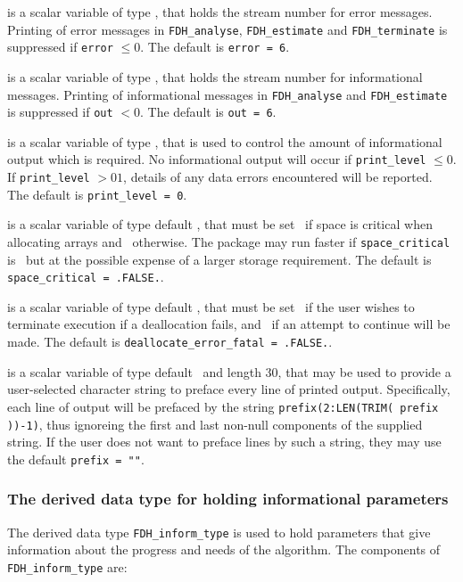 \documentclass{galahad}
\newcommand{\packagename}{FDH}
\begin{document}
\begin{description}

 is a scalar variable of type \integer, that holds the
stream number for error messages. Printing of error messages in 
{\tt \packagename\_analyse},
{\tt \packagename\_estimate} 
and {\tt \packagename\_terminate} 
is suppressed if {\tt error} $\leq 0$.
The default is {\tt error = 6}.

 is a scalar variable of type \integer, that holds the
stream number for informational messages. Printing of informational messages in 
{\tt \packagename\_analyse} and {\tt \packagename\_estimate} 
is suppressed if {\tt out} $< 0$.
The default is {\tt out = 6}.

 is a scalar variable of type \integer, that is used
to control the amount of informational output which is required. No 
informational output will occur if {\tt print\_level} $\leq 0$. If 
{\tt print\_level} $> 01$, details of any data errors encountered 
will be reported.
The default is {\tt print\_level = 0}.

 is a scalar variable of type default \logical, 
that must be set \true\ if space is critical when allocating arrays
and  \false\ otherwise. The package may run faster if 
{\tt space\_critical} is \false\ but at the possible expense of a larger
storage requirement. The default is {\tt space\_critical = .FALSE.}.

 is a scalar variable of type default \logical, 
that must be set \true\ if the user wishes to terminate execution if
a deallocation  fails, and \false\ if an attempt to continue
will be made. The default is {\tt deallocate\_error\_fatal = .FALSE.}.

 is a scalar variable of type default \character\
and length 30, that may be used to provide a user-selected 
character string to preface every line of printed output. 
Specifically, each line of output will be prefaced by the string 
{\tt prefix(2:LEN(TRIM( prefix ))-1)},
thus ignoreing the first and last non-null components of the
supplied string. If the user does not want to preface lines by such
a string, they may use the default {\tt prefix = ""}.

\end{description}


\subsubsection{The derived data type for holding informational
 parameters}\label{typeinform}
The derived data type 
{\tt \packagename\_inform\_type} 
is used to hold parameters that give information about the progress and needs 
of the algorithm. The components of 
{\tt \packagename\_inform\_type} 
are:
\end{document}
